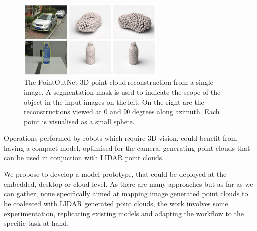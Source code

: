 \begin{figure}[ht]
 \centering 
 \includegraphics[width=7cm]{figures/fan-et-al-output.png}
 \caption{The PointOutNet 3D point cloud reconstruction from a single image. A segmentation mask is used to indicate the scope of the object in the input images on the left. On the right are the reconstructions viewed at 0 and 90 degrees along azimuth.  Each point is visualised as a small sphere.}
 \label{fig:fan-et-al-output}
\end{figure}

Operations performed by robots which require 3D vision, could benefit from having a compact model, optimised for the camera, generating point clouds that can be used in conjuction with LIDAR point clouds. 

We propose to develop a model prototype, that could be deployed at the embedded, desktop or cloud level. As there are many approaches but as far as we can gather, none specifically aimed at mapping image generated point clouds to be coalesced with LIDAR generated point clouds, the work involves some experimentation, replicating existing models and adapting the workflow to the specific task at hand.




